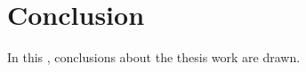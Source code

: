 
\chapter{Conclusion}
\label{chap:conclusions}

In this , conclusions about the thesis work are drawn.
